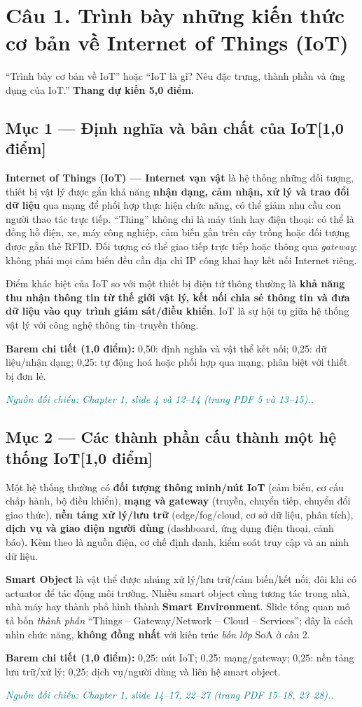 \documentclass[11pt,a4paper]{article}
\newcommand{\pointpart}[2]{\subsection*{Mục #1 --- #2\hfill\normalsize\color{teal}[1,0 điểm]}}
\newcommand{\src}[1]{\par\noindent\textcolor{teal}{\footnotesize\textit{Nguồn đối chiếu: #1.}}\par}
\newcommand{\scoring}[1]{\par\noindent\textbf{Barem chi tiết (1,0 điểm):} #1\par}
\newcommand{\kw}[1]{\textbf{#1}}
\begin{document}
\section{Câu 1. Trình bày những kiến thức cơ bản về Internet of Things (IoT)}
\begin{questionbox}
``Trình bày cơ bản về IoT'' hoặc ``IoT là gì? Nêu đặc trưng, thành phần và ứng dụng của IoT.'' \textbf{Thang dự kiến 5,0 điểm.}
\end{questionbox}
\pointpart{1}{Định nghĩa và bản chất của IoT}
\kw{Internet of Things (IoT) --- Internet vạn vật} là hệ thống những đối tượng, thiết bị vật lý được gắn khả năng \kw{nhận dạng, cảm nhận, xử lý và trao đổi dữ liệu} qua mạng để phối hợp thực hiện chức năng, có thể giảm nhu cầu con người thao tác trực tiếp. ``Thing'' không chỉ là máy tính hay điện thoại: có thể là đồng hồ điện, xe, máy công nghiệp, cảm biến gắn trên cây trồng hoặc đối tượng được gắn thẻ RFID. Đối tượng có thể giao tiếp trực tiếp hoặc thông qua \emph{gateway}; không phải mọi cảm biến đều cần địa chỉ IP công khai hay kết nối Internet riêng.

Điểm khác biệt của IoT so với một thiết bị điện tử thông thường là \kw{khả năng thu nhận thông tin từ thế giới vật lý, kết nối chia sẻ thông tin và đưa dữ liệu vào quy trình giám sát/điều khiển}. IoT là sự hội tụ giữa hệ thống vật lý với công nghệ thông tin--truyền thông.
\scoring{0,50: định nghĩa và vật thể kết nối; 0,25: dữ liệu/nhận dạng; 0,25: tự động hoá hoặc phối hợp qua mạng, phân biệt với thiết bị đơn lẻ.}
\src{Chapter 1, slide 4 và 12--14 (trang PDF 5 và 13--15).}

\pointpart{2}{Các thành phần cấu thành một hệ thống IoT}
Một hệ thống thường có \kw{đối tượng thông minh/nút IoT} (cảm biến, cơ cấu chấp hành, bộ điều khiển), \kw{mạng và gateway} (truyền, chuyển tiếp, chuyển đổi giao thức), \kw{nền tảng xử lý/lưu trữ} (edge/fog/cloud, cơ sở dữ liệu, phân tích), \kw{dịch vụ và giao diện người dùng} (dashboard, ứng dụng điện thoại, cảnh báo). Kèm theo là nguồn điện, cơ chế định danh, kiểm soát truy cập và an ninh dữ liệu.

\kw{Smart Object} là vật thể được nhúng xử lý/lưu trữ/cảm biến/kết nối, đôi khi có actuator để tác động môi trường. Nhiều smart object cùng tương tác trong nhà, nhà máy hay thành phố hình thành \kw{Smart Environment}. Slide tổng quan mô tả bốn \emph{thành phần} ``Things -- Gateway/Network -- Cloud -- Services''; đây là cách nhìn chức năng, \kw{không đồng nhất} với kiến trúc \emph{bốn lớp} SoA ở câu 2.
\scoring{0,25: nút IoT; 0,25: mạng/gateway; 0,25: nền tảng lưu trữ/xử lý; 0,25: dịch vụ/người dùng và liên hệ smart object.}
\src{Chapter 1, slide 14--17, 22--27 (trang PDF 15--18, 23--28).}
\end{document}
